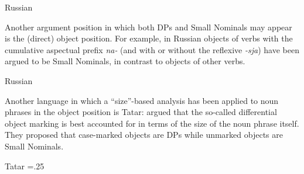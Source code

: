 \documentclass[output=paper]{langsci/langscibook}
\begin{document}
\ea%
    \label{pereex:1}
    Russian 
    \z 
\z 


Another argument position in which both DPs and Small Nominals may appear is the (direct) object position. 
For example, in Russian objects of verbs with the cumulative aspectual prefix \textit{na-} (and with or without the reflexive \textit{{}-sja}) 
have been argued to be Small Nominals, in contrast to objects of other verbs.

\ea%
    \label{pereex:2}
    Russian 
    \z 
\z

Another language in which a ``size''-based analysis has been applied to noun phrases in the object position is Tatar: 
\citet{LyutikovaPereltsvaig2015} argued that the so-called differential object marking is best accounted for in terms of the size of the noun phrase itself. 
They proposed that case-marked objects are DPs while unmarked objects are Small Nominals.\pagebreak

\ea%
    \label{pereex:3}
    Tatar 
    \multicolsep=.25\baselineskip
    \begin{multicols}{2}\raggedcolumns
    \z 
    \end{multicols}
\z
\end{document}
